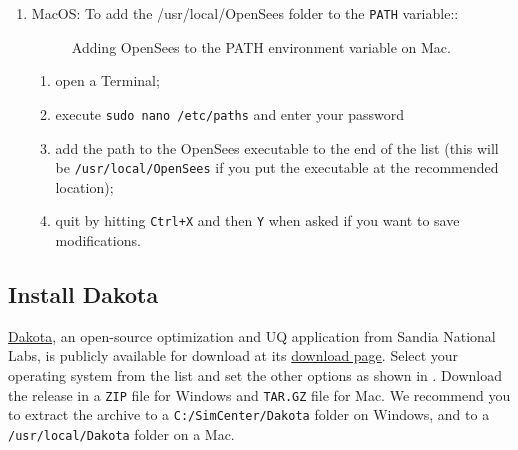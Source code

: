 \begin{enumerate}
\item MacOS: To add the /usr/local/OpenSees folder to the \texttt{PATH} variable::

\begin{figure}[!htbp]
  \caption{Adding OpenSees to the PATH environment variable on Mac.}
  \label{fig:add_env_path_Mac}
\end{figure}

\begin{enumerate}
    \item open a Terminal;
    \item execute \texttt{sudo nano /etc/paths} and enter your password
    \item add the path to the OpenSees executable to the end of the list (this will be \texttt{/usr/local/OpenSees} if you put the executable at the recommended location);
    \item quit by hitting \texttt{Ctrl+X} and then \texttt{Y} when asked if you want to save modifications.
\end{enumerate}

\end{enumerate}



\subsection{Install Dakota}

\href{http://dakota.sandia.gov}{Dakota}, an open-source  optimization and UQ application from Sandia National Labs, is publicly available for download at its \href{http://dakota.sandia.gov/download.html}{download page}. Select your operating system from the list and set the other options as shown in  . Download the release in a \texttt{ZIP} file for Windows and \texttt{TAR.GZ} file for Mac. We recommend you to extract the archive to a \texttt{C:/SimCenter/Dakota} folder on Windows, and to a \texttt{/usr/local/Dakota} folder on a Mac.

